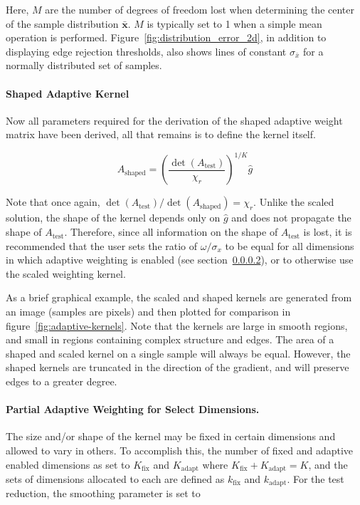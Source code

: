 Here, $M$ are the number of degrees of freedom lost when determining the
center of the sample distribution $\bar{\bm{x}}$.  $M$ is typically set to 1
when a simple mean operation is performed.
Figure~\ref{fig:distribution_error_2d}, in addition to displaying edge
rejection thresholds, also shows lines of constant $\sigma_{\bar{x}}$ for
a normally distributed set of samples.

\paragraph{Shaped Adaptive Kernel}
\label{paragraph:shaped-adaptive-kernel}

Now all parameters required for the derivation of the shaped adaptive weight
matrix have been derived, all that remains is to define the kernel itself.

\begin{equation}
    A_{\text{shaped}} = \left(
        \frac{\det(A_{\text{test}})}{\chi_r}
    \right)^{1 / K} \hat{g}
    \label{eq:equation62}
\end{equation}

Note that once again, $\det(A_{\text{test}}) /\det(A_{\text{shaped}}) = \chi_r$.
Unlike the scaled solution, the shape of the kernel depends only on
$\hat{g}$ and does not propagate the shape of $A_{\text{test}}$.
Therefore, since all information on the shape of $A_{\text{test}}$ is lost,
it is recommended that the user sets the ratio of $\omega / \sigma_x$ to be
equal for all dimensions in which adaptive weighting is enabled
(see section~\ref{paragraph:partial-adaptive-weighting}), or to otherwise
use the scaled weighting kernel.

As a brief graphical example, the scaled and shaped kernels are
generated from an image (samples are pixels) and then plotted for comparison
in figure~\ref{fig:adaptive-kernels}.
Note that the kernels are large in smooth regions, and small in regions
containing complex structure and edges.
The area of a shaped and scaled kernel on a single sample will always
be equal.
However, the shaped kernels are truncated in the direction of the gradient,
and will preserve edges to a greater degree.

\paragraph{Partial Adaptive Weighting for Select Dimensions.}
\label{paragraph:partial-adaptive-weighting}

The size and/or shape of the kernel may be fixed in certain dimensions and
allowed to vary in others.
To accomplish this, the number of fixed and adaptive enabled dimensions as
set to $K_{\text{fix}}$ and $K_{\text{adapt}}$ where
$K_{\text{fix}} + K_{\text{adapt}} = K$, and the sets of dimensions
allocated to each are defined as $k_{\text{fix}}$ and $k_{\text{adapt}}$.
For the test reduction, the smoothing parameter is set to

